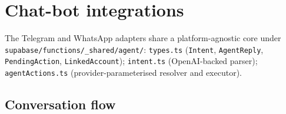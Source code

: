 \documentclass[11pt,a4paper,oneside]{article}
\newcommand{\code}[1]{\texttt{\small #1}}
\begin{document}
\section{Chat-bot integrations}\label{sec:bots}

The Telegram and WhatsApp adapters share a platform-agnostic core
under \code{supabase/functions/\_shared/agent/}:
\code{types.ts} (\code{Intent}, \code{AgentReply},
\code{PendingAction}, \code{LinkedAccount});
\code{intent.ts} (OpenAI-backed parser);
\code{agentActions.ts} (provider-parameterised resolver and executor).

\subsection{Conversation flow}
\end{document}
